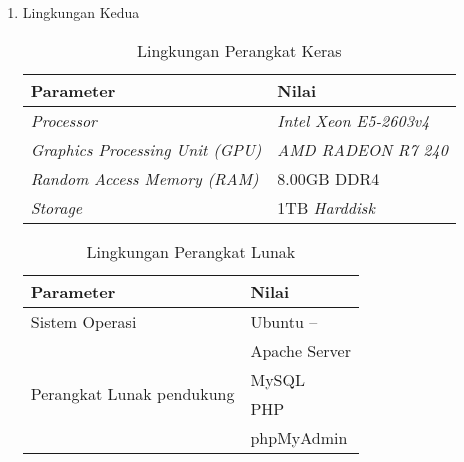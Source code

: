 \begin{enumerate}
	\item Lingkungan Kedua
	\begin{table}[H] %
		\caption{Lingkungan Perangkat Keras}
		\centering
		\label{tab:lingkunganpkpe}
		\begin{tabular}{|l|l|}
			\hline
			\textbf{Parameter} & \textbf{Nilai} \\
			\hline
			\textit{Processor} & \textit{Intel Xeon E5-2603v4}\\
			\hline
			\textit{Graphics Processing Unit (GPU)} & \textit{AMD RADEON R7 240}\\
			\hline
			\textit{Random Access Memory (RAM)}& 8.00GB DDR4\\
			\hline
			\textit{Storage} & 1TB \textit{Harddisk}\\
			\hline
		\end{tabular}%
	\end{table}
	
	\begin{table}[h] %
		\caption{Lingkungan Perangkat Lunak}
		\label{tab:lingkunganplpe}
		\centering
		\begin{tabular}{|l|l|}
			\hline
			\textbf{Parameter} & \textbf{Nilai} \\
			\hline
			Sistem Operasi & Ubuntu --\\
			\hline
			\multirow{4}{*}{Perangkat Lunak pendukung} 	& Apache Server\\
			& MySQL \\
			& PHP\\
			& phpMyAdmin\\
			\hline
		\end{tabular}%
	\end{table}
\end{enumerate}


